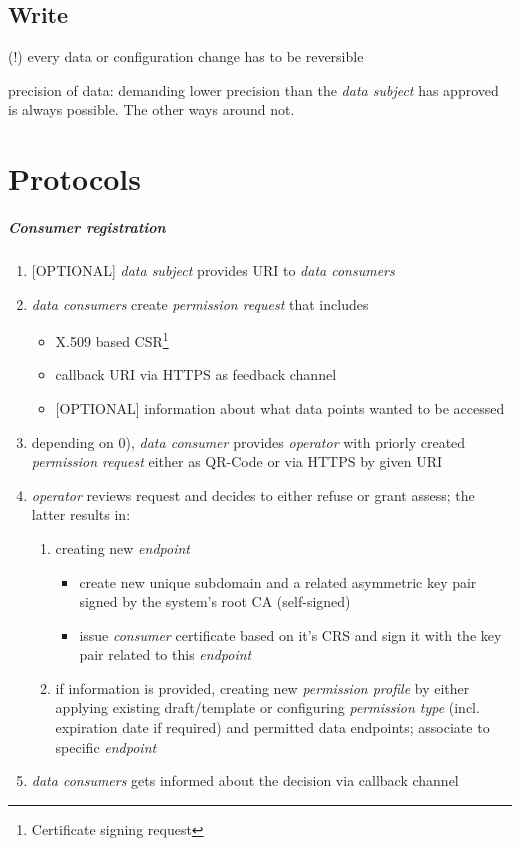 \documentclass[12pt,english,a4paper,titlepage,cleardoublepage=empty,dottedtoc]{report}
\providecommand{\tightlist}{%
  \setlength{\itemsep}{0pt}\setlength{\parskip}{0pt}}
\begin{document}
\subsection{Write}\label{write}

(!) every data or configuration change has to be reversible

precision of data: demanding lower precision than the \emph{data
subject} has approved is always possible. The other ways around not.

\section{Protocols}\label{protocols}

\subparagraph{Consumer registration}\label{consumer-registration}

\begin{enumerate}
\def\labelenumi{\arabic{enumi})}
\setcounter{enumi}{-1}
\item
  {[}OPTIONAL{]} \emph{data subject} provides URI to \emph{data
  consumers}
\item
  \emph{data consumers} create \emph{permission request} that includes

  \begin{itemize}
  \tightlist
  \item
    X.509 based CSR\footnote{Certificate signing request}
  \item
    callback URI via HTTPS as feedback channel
  \item
    {[}OPTIONAL{]} information about what data points wanted to be
    accessed
  \end{itemize}
\item
  depending on 0), \emph{data consumer} provides \emph{operator} with
  priorly created \emph{permission request} either as QR-Code or via
  HTTPS by given URI
\item
  \emph{operator} reviews request and decides to either refuse or grant
  assess; the latter results in:

  \begin{enumerate}
  \def\labelenumii{\alph{enumii})}
  \tightlist
  \item
    creating new \emph{endpoint}

    \begin{itemize}
    \tightlist
    \item
      create new unique subdomain and a related asymmetric key pair
      signed by the system's root CA (self-signed)
    \item
      issue \emph{consumer} certificate based on it's CRS and sign it
      with the key pair related to this \emph{endpoint}
    \end{itemize}
  \item
    if information is provided, creating new \emph{permission profile}
    by either applying existing draft/template or configuring
    \emph{permission type} (incl. expiration date if required) and
    permitted data endpoints; associate to specific \emph{endpoint}
  \end{enumerate}
\item
  \emph{data consumers} gets informed about the decision via callback
  channel


\end{enumerate}
\end{document}
